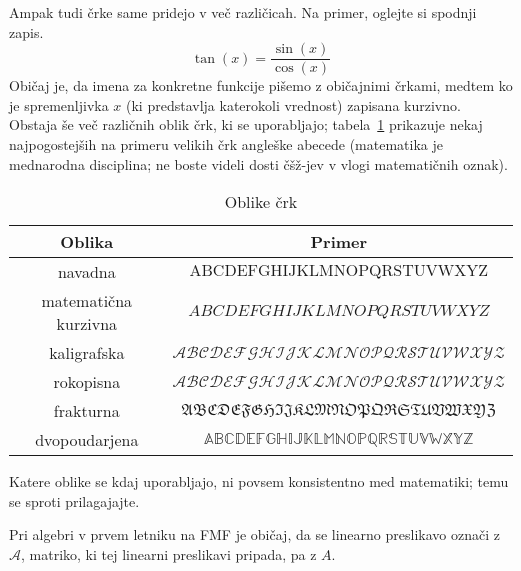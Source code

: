                 Ampak tudi črke same pridejo v več različicah. Na primer, oglejte si spodnji zapis.
                \[\tan(x) = \frac{\sin(x)}{\cos(x)}\]
                Običaj je, da imena za konkretne funkcije pišemo z običajnimi črkami, medtem ko je spremenljivka $x$ (ki predstavlja katerokoli vrednost) zapisana kurzivno. Obstaja še več različnih oblik črk, ki se uporabljajo; tabela~\ref{TABELA: Oblike črk} prikazuje nekaj najpogostejših na primeru velikih črk angleške abecede (matematika je mednarodna disciplina; ne boste videli dosti čšž-jev v vlogi matematičnih oznak).

                \begin{table}[!ht]
                        \centering
                        \begin{tabular}{c|c}
                                \textbf{Oblika} & \textbf{Primer} \\
                                \hline
                                navadna & $\mathrm{ABCDEFGHIJKLMNOPQRSTUVWXYZ}$ \\
                                matematična kurzivna & $ABCDEFGHIJKLMNOPQRSTUVWXYZ$ \\
                                kaligrafska & $\mathcal{ABCDEFGHIJKLMNOPQRSTUVWXYZ}$ \\
                                rokopisna & $\mathscr{ABCDEFGHIJKLMNOPQRSTUVWXYZ}$ \\
                                frakturna & $\mathfrak{ABCDEFGHIJKLMNOPQRSTUVWXYZ}$ \\
                                dvopoudarjena & $\mathbb{ABCDEFGHIJKLMNOPQRSTUVWXYZ}$
                        \end{tabular}
                        \caption{Oblike črk}\label{TABELA: Oblike črk}
                \end{table}



                Katere oblike se kdaj uporabljajo, ni povsem konsistentno med matematiki; temu se sproti prilagajajte.

                \begin{zgled}
                        Pri algebri v prvem letniku na FMF je običaj, da se linearno preslikavo označi z $\mathcal{A}$, matriko, ki tej linearni preslikavi pripada, pa z $A$.
                \end{zgled}

